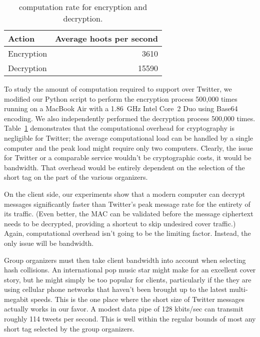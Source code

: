 \begin{table}
\caption{\hoot computation rate for encryption and
  decryption.\label{tab:hps}}

\begin{center}
    \begin{tabular}{ l  r }
	Action & Average hoots per second \\ \hline
	Encryption & 3610 \\
	Decryption & 15590 
    \end{tabular}
\end{center}
\end{table}

To study the amount of computation required to support \hoot over
Twitter, we modified our Python script to perform the encryption process 
500,000 times running on a MacBook
Air with a 1.86~GHz Intel Core~2 Duo using Base64 encoding. We 
also independently performed the decryption process 500,000 times. 
Table~\ref{tab:hps} demonstrates that the computational overhead
for \hoot cryptography is negligible for Twitter; the average
computational load can be handled by a single computer and the peak
load might require only two computers. Clearly, the issue for Twitter
or a comparable service wouldn't be cryptographic costs, it would be
bandwidth. That overhead would be entirely dependent on the selection
of the short tag on the part of the various \hoot organizers. 

On the client side, our experiments show that a modern computer can
decrypt \hoot messages significantly faster than Twitter's peak
message rate for the entirety of its traffic. (Even better, the MAC
can be validated before the message ciphertext needs to be decrypted,
providing a shortcut to skip undesired cover traffic.)  Again,
computational overhead isn't going to be the limiting factor.
Instead, the only issue will be bandwidth.

Group organizers must then take client bandwidth into account when
selecting hash collisions. An international pop music star might make
for an excellent cover story, but he might simply be too popular for
clients, particularly if the they are using cellular phone networks
that haven't been brought up to the latest multi-megabit speeds.
This is the one place where the short size of Twitter
messages actually works in our favor. A modest data pipe of 128
kbits/sec can transmit roughly 114 tweets per second. This is well
within the regular bounds of most any short tag selected by the group
organizers.


